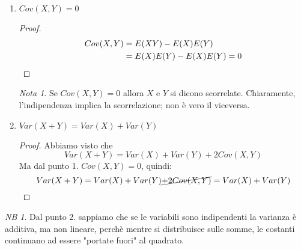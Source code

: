 \documentclass{article}
\theoremstyle{plain}
\theoremstyle{definition}
\theoremstyle{remark}
\newtheorem*{nota}{Nota}
\newtheorem*{NB}{NB}
\begin{document}
\begin{enumerate}
	\item $Cov(X,Y)=0$
	\begin{proof}
		\begin{align*}
			Cov(X,Y)&=E(XY)-E(X)E(Y)\\
			&=E(X)E(Y)-E(X)E(Y)=0\qedhere
		\end{align*}
	\end{proof}
	\begin{nota}
		Se $Cov(X,Y)=0$ allora $X$ e $Y$ si dicono scorrelate. Chiaramente, l'indipendenza implica la scorrelazione; non è vero il viceversa.
	\end{nota}
	\item $Var(X+Y)=Var(X)+Var(Y)$
	\begin{proof}
		Abbiamo visto che
		\begin{equation*}
			Var(X+Y)=Var(X)+Var(Y)+2Cov(X,Y)
		\end{equation*}
		Ma dal punto 1. $Cov(X,Y)=0$, quindi:
		\begin{equation*}
			Var(X+Y)=Var(X)+Var(Y)\cancel{+2Cov(X,Y)}=Var(X)+Var(Y)\qedhere
		\end{equation*}
	\end{proof}
\end{enumerate}
\begin{NB}
	Dal punto 2. sappiamo che se le variabili sono indipendenti la varianza è additiva, ma non lineare, perchè mentre si distribuisce sulle somme, le costanti continuano ad essere "portate fuori" al quadrato.
\end{NB}
\end{document}
